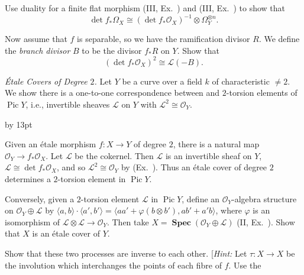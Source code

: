 {{{\noindent\hypertarget{ex-IV-2.6c}{}Use duality for a finite flat morphism (III, Ex.~) and (III, Ex.~) to show that
\[
\det f_*\Omega_X\cong(\det f_*\mathcal O_X)^{-1}\otimes\Omega_Y^{\otimes n}.
\]

\noindent\hypertarget{ex-IV-2.6d}{}Now assume that $f$ is separable, so we have the ramification divisor $R$. We define the \emph{branch divisor} $B$ to be the divisor $f_*R$ on $Y$. Show that
\[
(\det f_*\mathcal O_X)^2\cong\mathcal L(-B).
\]\par}

\smallskip
\noindent\hypertarget{ex-IV-2.7}{}\emph{\'Etale Covers of Degree $2$.} Let $Y$ be a curve over a field $k$ of characteristic $\ne2$. We show there is a one-to-one correspondence between
and $2$-torsion elements of $\operatorname{Pic}Y$, i.e., invertible sheaves $\mathcal L$ on $Y$ with $\mathcal L^2\cong\mathcal O_Y$.
{\advance\leftskip by 13pt\par
\noindent\hypertarget{ex-IV-2.7a}{}Given an \'etale morphism $f\colon X\to Y$ of degree $2$, there is a natural map $\mathcal O_Y\to f_*\mathcal O_X$. Let $\mathcal L$ be the cokernel. Then $\mathcal L$ is an invertible sheaf on $Y$, $\mathcal L\cong\det f_*\mathcal O_X$, and so $\mathcal L^2\cong\mathcal O_Y$ by (Ex.~). Thus an \'etale cover of degree $2$ determines a $2$-torsion element in $\operatorname{Pic}Y$.

\noindent\hypertarget{ex-IV-2.7b}{}Conversely, given a $2$-torsion element $\mathcal L$ in $\operatorname{Pic}Y$, define an $\mathcal O_Y$-algebra structure on $\mathcal O_Y\oplus\mathcal L$ by $\langle a,b\rangle\cdot\langle a',b'\rangle=\langle aa'+\varphi(b\otimes b'),ab'+a'b\rangle$, where $\varphi$ is an isomorphism of $\mathcal L\otimes\mathcal L\to\mathcal O_Y$. Then take $X=\operatorname{\mathbf{Spec}}(\mathcal O_Y\oplus\mathcal L)$ (II, Ex.~). Show that $X$ is an \'etale cover of $Y$.

\noindent\hypertarget{ex-IV-2.7c}{}Show that these two processes are inverse to each other. [\emph{Hint:} Let $\tau\colon X\to X$ be the involution which interchanges the points of each fibre of $f$. Use the\par}\par}
}

